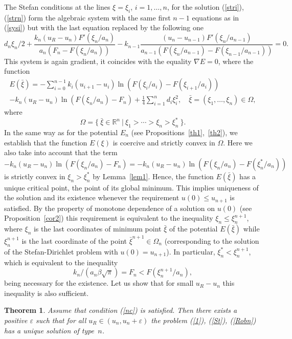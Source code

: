 \documentclass[10pt,a4paper]{amsart}
\newtheorem{theorem}{Theorem}[section]
\numberwithin{equation}{section}
\newcommand{\R}{{\mathbb R}}
\begin{document}
The Stefan conditions at the lines $\xi=\xi_i$, $i=1,\ldots,n$, for the solution (\ref{stri}), (\ref{strn}) form the algebraic system with the same first $n-1$ equations as in (\ref{sysi}) but with the last equation replaced by the following one
\[
d_n\xi_n/2+\frac{k_n(u_R-u_n)F'(\xi_n/a_n)}{a_n(F_n-F(\xi_n/a_n))}- k_{n-1}\frac{(u_n-u_{n-1})F'(\xi_n/a_{n-1})}{a_{n-1}(F(\xi_n/a_{n-1})-F(\xi_{n-1}/a_{n-1}))}=0.
\]
This system is again gradient, it coincides with the equality $\nabla E=0$, where the function
\begin{align*}
E(\bar\xi)=-\sum_{i=0}^{n-1}k_i(u_{i+1}-u_i)\ln (F(\xi_i/a_i)-F(\xi_{i+1}/a_i))\nonumber\\
-k_n(u_R-u_n)\ln (F(\xi_n/a_n)-F_n)+\frac{1}{4}\sum_{i=1}^n d_i\xi_i^2, \quad \bar\xi=(\xi_1,\ldots,\xi_n)\in\Omega,
\end{align*}
where
\[\Omega=\{ \ \bar\xi\in\R^n \ | \ \xi_1>\cdots>\xi_n>\xi_n^* \ \}.\]
In the same way as for the potential $E_n$ (see Propositions~\ref{th1},~\ref{th2}), we establish that the function $E(\xi)$
is coercive and strictly convex in $\Omega$. Here we also take into account that the term $-k_n(u_R-u_n)\ln (F(\xi_n/a_n)-F_n)=-k_n(u_R-u_n)\ln (F(\xi_n/a_n)-F(\xi^*_n/a_n))$ is strictly convex in $\xi_n>\xi_n^*$ by Lemma~\ref{lem1}. Hence, the function $E(\bar\xi)$  has a unique critical point, the point of its global minimum.
This implies uniqueness of the solution and its existence whenever the requirement $u(0)\le u_{n+1}$ is satisfied. By the property of monotone dependence of a solution on $u(0)$ (see Proposition~\ref{cor2}) this requirement is equivalent to the inequality $\xi_n\le\xi_n^{n+1}$, where $\xi_n$ is the last coordinates of minimum point $\bar\xi$ of the potential $E(\bar\xi)$ while $\xi_n^{n+1}$ is the last coordinate of the point $\bar\xi^{n+1}\in\Omega_n$ (corresponding to the solution of the Stefan-Dirichlet problem with $u(0)=u_{n+1}$). In particular, $\xi^*_n<\xi_n^{n+1}$, which is equivalent to the inequality
\begin{equation}\label{nc}
k_n/(a_n\beta\sqrt{\pi})=F_n<F(\xi_n^{n+1}/a_n),
\end{equation}
being necessary for the existence. Let us show that for small $u_R-u_n$ this inequality is also sufficient.


\begin{theorem}\label{th7}
Assume that condition (\ref{nc}) is satisfied. Then there exists a positive $\varepsilon$ such that for all $u_R\in (u_n,u_n+\varepsilon)$ the problem (\ref{1}), (\ref{St}), (\ref{Robn}) has a unique solution of type~$n$.
\end{theorem}
\end{document}
